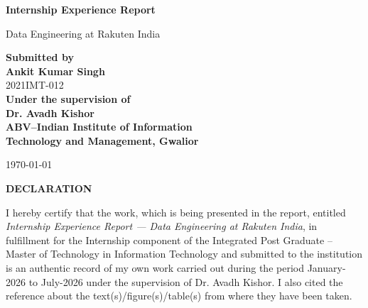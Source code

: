 \documentclass[12pt, a4paper]{article}
\begin{document}
\begin{titlepage}
    \centering
    \vspace*{2cm}
    
    {\Huge\bfseries Internship Experience Report}
    
    \vspace{0.5cm}
    {\LARGE Data Engineering at Rakuten India}
    
    \vspace{2cm}
    
    {\large \textbf{Submitted by}} \\[8pt]
    {\Large \textbf{Ankit Kumar Singh}} \\[4pt]
    {\large 2021IMT-012} \\[20pt]
    {\large \textbf{Under the supervision of}} \\[8pt]
    {\Large \textbf{Dr. Avadh Kishor}} \\[20pt]
    {\large \textbf{ABV--Indian Institute of Information}} \\
    {\large \textbf{Technology and Management, Gwalior}}
    
    \vfill
    {\large \today}
\end{titlepage}



\newpage
\thispagestyle{empty}

\begin{center}
{\Large \bf DECLARATION}
\end{center}
\vspace{0.5cm}
\noindent I hereby certify that the work, which is being presented in the report, entitled \textit{Internship Experience Report --- Data Engineering at Rakuten India}, in fulfillment for the Internship component of the Integrated Post Graduate -- Master of Technology in Information Technology and submitted to the institution is an authentic record of my own work carried out during the period January-2026 to July-2026 under the supervision of Dr. Avadh Kishor. I also cited the reference about the text(s)/figure(s)/table(s) from where they have been taken.

\vspace{1cm}
\end{document}

